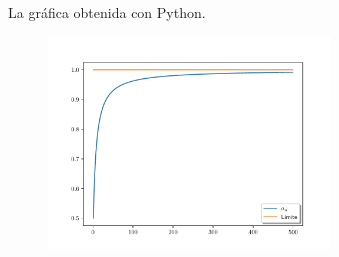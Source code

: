 \begin{frame}[fragile]
    La gráfica obtenida con Python.

    \begin{minipage}{0.5\textwidth}
        \begin{figure}[ht!]
            \centering
            \includegraphics[width=7.5cm]{questions/p5}
        \end{figure}
    \end{minipage}
    \begin{minipage}{0.4\textwidth}
    \end{minipage}
\end{frame}

\begin{frame}[fragile]
    \begin{solution}
        \begin{columns}
            \begin{column}{0.48\textwidth}
                \inputminted[fontsize=\tiny,firstline=3,lastline=6]{python}{questions/p5.py}

                \

                \inputminted[fontsize=\tiny,firstline=8,lastline=10]{python}{questions/p5.py}

            \end{column}
            \begin{column}{0.48\textwidth}
                \inputminted[fontsize=\tiny,firstline=12,lastline=16]{python}{questions/p5.py}

                \

                \inputminted[fontsize=\tiny,firstline=18,lastline=22]{python}{questions/p5.py}
            \end{column}
        \end{columns}
    \end{solution}
\end{frame}